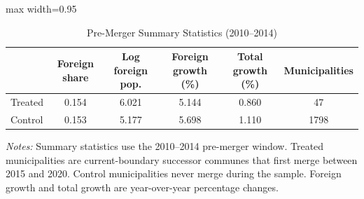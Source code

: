 \begin{table}[htbp]\centering
\caption{Pre-Merger Summary Statistics (2010--2014)}
\begin{adjustbox}{max width=0.95\textwidth}
\begin{tabular}{lccccc}
\toprule
 & Foreign share & Log foreign pop. & Foreign growth (\%) & Total growth (\%) & Municipalities \\
\midrule
Treated & 0.154 & 6.021 & 5.144 & 0.860 & 47 \\
Control & 0.153 & 5.177 & 5.698 & 1.110 & 1798 \\
\bottomrule
\end{tabular}
\end{adjustbox}
\parbox{0.95\textwidth}{\footnotesize \textit{Notes:} Summary statistics use the 2010--2014 pre-merger window. Treated municipalities are current-boundary successor communes that first merge between 2015 and 2020. Control municipalities never merge during the sample. Foreign growth and total growth are year-over-year percentage changes.}
\end{table}
